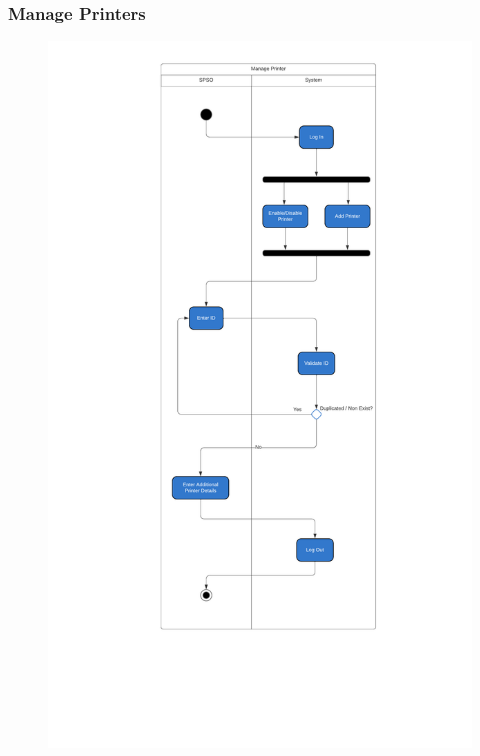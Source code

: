     \subsubsection{Manage Printers}
    \begin{center}
    \begin{figure}[!htp]
    \begin{center}
     \includegraphics[scale=.45]{images/Task2/ActivityDiagrams/ManagePrinter.pdf}
    \end{center}
    \label{refhinh1}
    \end{figure}
    \end{center}

